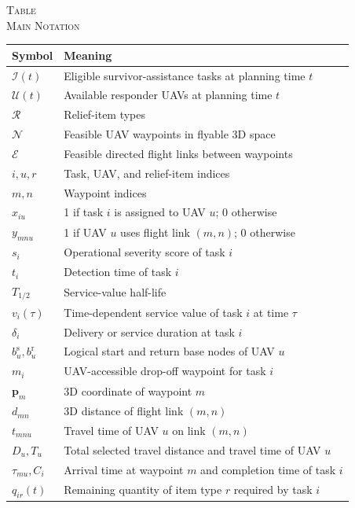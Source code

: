 \documentclass[conference]{IEEEtran}
\begin{document}
\begin{center}
\footnotesize
\textsc{Table~\thetable}\\
\textsc{Main Notation}\\[0.4ex]
\renewcommand{\arraystretch}{1.04}
\begin{tabular}{p{}p{}}
\toprule
\textbf{Symbol} & \textbf{Meaning}\\
\midrule
$\mathcal{I}(t)$ & Eligible survivor-assistance tasks at planning time $t$\\
$\mathcal{U}(t)$ & Available responder UAVs at planning time $t$\\
$\mathcal{R}$ & Relief-item types\\
$\mathcal{N}$ & Feasible UAV waypoints in flyable 3D space\\
$\mathcal{E}$ & Feasible directed flight links between waypoints\\
$i,u,r$ & Task, UAV, and relief-item indices\\
$m,n$ & Waypoint indices\\
$x_{iu}$ & 1 if task $i$ is assigned to UAV $u$; 0 otherwise\\
$y_{mnu}$ & 1 if UAV $u$ uses flight link $(m,n)$; 0 otherwise\\
$s_i$ & Operational severity score of task $i$\\
$t_i$ & Detection time of task $i$\\
$T_{1/2}$ & Service-value half-life\\
$v_i(\tau)$ & Time-dependent service value of task $i$ at time $\tau$\\
$\delta_i$ & Delivery or service duration at task $i$\\
$b_u^{\mathrm{s}}, b_u^{\mathrm{r}}$ & Logical start and return base nodes of UAV $u$\\
$m_i$ & UAV-accessible drop-off waypoint for task $i$\\
$\mathbf{p}_m$ & 3D coordinate of waypoint $m$\\
$d_{mn}$ & 3D distance of flight link $(m,n)$\\
$t_{mnu}$ & Travel time of UAV $u$ on link $(m,n)$\\
$D_u,T_u$ & Total selected travel distance and travel time of UAV $u$\\
$\tau_{mu},C_i$ & Arrival time at waypoint $m$ and completion time of task $i$\\
$q_{ir}(t)$ & Remaining quantity of item type $r$ required by task $i$\\

\end{tabular}
\end{center}
\end{document}
